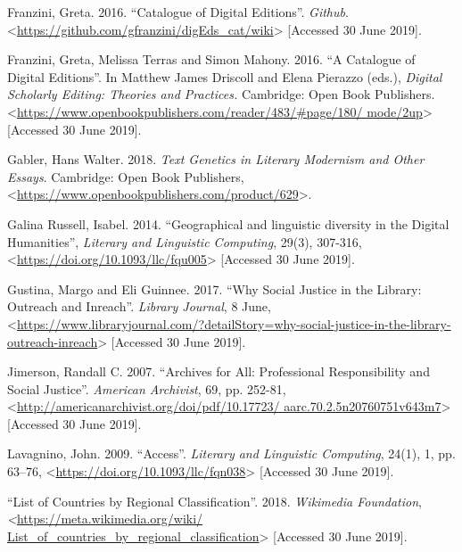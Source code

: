 \begin{paper}
\begin{flushleft}
Franzini, Greta. 2016. ``Catalogue of Digital Editions''.
\emph{Github}.
\textless{}\href{https://github.com/gfranzini/digEds\_cat/wiki}{https://github.com/gfranzini/digEds\_cat/wiki}\textgreater{}
{[}Accessed 30 June 2019{]}.

Franzini, Greta, Melissa Terras and Simon Mahony. 2016. ``A Catalogue of
Digital Editions''. In Matthew James Driscoll and Elena Pierazzo (eds.),
\emph{Digital Scholarly Editing: Theories and Practices.} Cambridge:
Open Book Publishers. \textless{}\href{https://www.openbookpublishers.com/reader/483/\#page/180/mode/2up}{https://www.openbookpublishers.com/reader/483/\#page/180/ mode/2up}\textgreater{}
{[}Accessed 30 June 2019{]}.

Gabler, Hans Walter. 2018. \emph{Text Genetics in Literary Modernism and
Other Essays}. Cambridge: Open Book Publishers,
\textless{}\href{https://www.openbookpublishers.com/product/629}{https://www.openbookpublishers.com/product/629}\textgreater{}.

Galina Russell, Isabel. 2014. ``Geographical and linguistic diversity in
the Digital Humanities'', \emph{Literary and Linguistic Computing},
29(3), 307-316,
\textless{}\href{https://doi.org/10.1093/llc/fqu005}{https://doi.org/10.1093/llc/fqu005}\textgreater{}
{[}Accessed 30 June 2019{]}.

Gustina, Margo and Eli Guinnee. 2017. ``Why Social Justice in the
Library: Outreach and Inreach''. \emph{Library Journal}, 8 June,
\textless{}\href{https://www.libraryjournal.com/?detailStory=why-social-justice-in-the-library-outreach-inreach}{https://www.libraryjournal.com/?detailStory=why-social-justice-in-the-library-outreach-inreach}\textgreater{}
{[}Accessed 30 June 2019{]}.

Jimerson, Randall C. 2007. ``Archives for All: Professional
Responsibility and Social Justice''. \emph{American Archivist}, 69, pp.
252-81,
\textless{}\href{http://americanarchivist.org/doi/pdf/10.17723/aarc.70.2.5n20760751v643m7}{http://americanarchivist.org/doi/pdf/10.17723/ aarc.70.2.5n20760751v643m7}\textgreater{}
{[}Accessed 30 June 2019{]}.

Lavagnino, John. 2009. ``Access''. \emph{Literary and Linguistic
Computing}, 24(1), 1, pp. 63--76,
\textless{}\href{https://doi.org/10.1093/llc/fqn038}{https://doi.org/10.1093/llc/fqn038}\textgreater{}
{[}Accessed 30 June 2019{]}.

``List of Countries by Regional Classification''. 2018. \emph{Wikimedia
Foundation}, \emph{\textless{}}\href{https://meta.wikimedia.org/wiki/List\_of\_countries\_by\_regional\_classification}{https://meta.wikimedia.org/wiki/ List\_of\_countries\_by\_regional\_classification}\textgreater{}
{[}Accessed 30 June 2019{]}.


\end{flushleft}
\end{paper}
